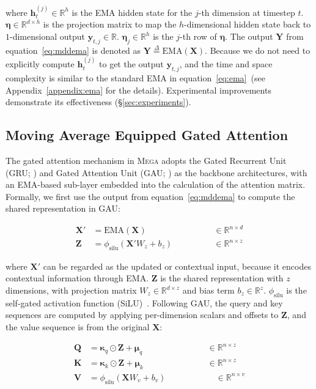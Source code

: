 where $\mathbf{h}^{(j)}_t \in \mathbb{R}^{h}$ is the EMA hidden state for the $j$-th dimension at timestep $t$. 
$\boldsymbol{\eta} \in \mathbb{R}^{d\times h}$ is the projection matrix to map the $h$-dimensional hidden state back to $1$-dimensional output $\mathbf{y}_{t,j} \in \mathbb{R} $. $\boldsymbol{\eta}_j \in \mathbb{R}^{h}$ is the $j$-th row of $\boldsymbol{\eta}$.
The output $\boldsymbol{Y}$ from equation~\ref{eq:mddema} is denoted as $\boldsymbol{Y} \stackrel{\Delta}{=} \mathrm{EMA}(\boldsymbol{X})$.
Because we do not need to explicitly compute $\mathbf{h}^{(j)}_t$ to get the output $\mathbf{y}_{t,j}$, and the time and space complexity is similar to the standard EMA in equation~\ref{eq:ema}~(see Appendix~\ref{appendix:ema} for the details). Experimental improvements demonstrate its effectiveness (\S\ref{sec:experiments}).

\subsection{Moving Average Equipped Gated Attention}
\label{subsec:mega}
The gated attention mechanism in \textsc{Mega} adopts the Gated Recurrent Unit (GRU; \citet{cho2014properties}) and Gated Attention Unit (GAU; \citet{hua2022transformer}) as the backbone architectures, with an EMA-based sub-layer embedded into the calculation of the attention matrix. Formally, we first use the output from equation~\ref{eq:mddema} to compute the shared representation in GAU:

\begin{align}
\boldsymbol{X}' & = \mathrm{EMA}(\boldsymbol{X}) \qquad & \qquad \in \mathbb{R}^{n\times d} \\
\boldsymbol{Z} & = \phi_{\mathrm{silu}}(\boldsymbol{X}' W_z + b_z) \qquad & \qquad \in \mathbb{R}^{n\times z} \label{eq:z}
\end{align}

where $\boldsymbol{X}'$ can be regarded as the updated or contextual input, because it encodes contextual information through EMA. 
$\boldsymbol{Z}$ is the shared representation with $z$ dimensions, with projection matrix $W_z \in \mathbb{R}^{d\times z}$ and bias term $b_z \in \mathbb{R}^{z}$.  
$\phi_{\mathrm{silu}}$ is the self-gated activation function (SiLU)~\citep{ramachandran2017swish,elfwing2018sigmoid}. Following GAU, the query and key sequences are computed by applying per-dimension scalars and offsets to $\boldsymbol{Z}$, and the value sequence is from the original $\boldsymbol{X}$:

\begin{align}
\boldsymbol{Q} & = \boldsymbol{\kappa}_q \odot \boldsymbol{Z} + \boldsymbol{\mu}_q \qquad & \qquad \in \mathbb{R}^{n\times z} \label{eq:query} \\
\boldsymbol{K} & = \boldsymbol{\kappa}_k \odot \boldsymbol{Z} + \boldsymbol{\mu}_k \qquad & \qquad \in \mathbb{R}^{n\times z} \\
\boldsymbol{V} & = \phi_{\mathrm{silu}}(\boldsymbol{X} W_v + b_v) \qquad & \quad \qquad \in \mathbb{R}^{n\times v} \label{eq:value}
\end{align}


